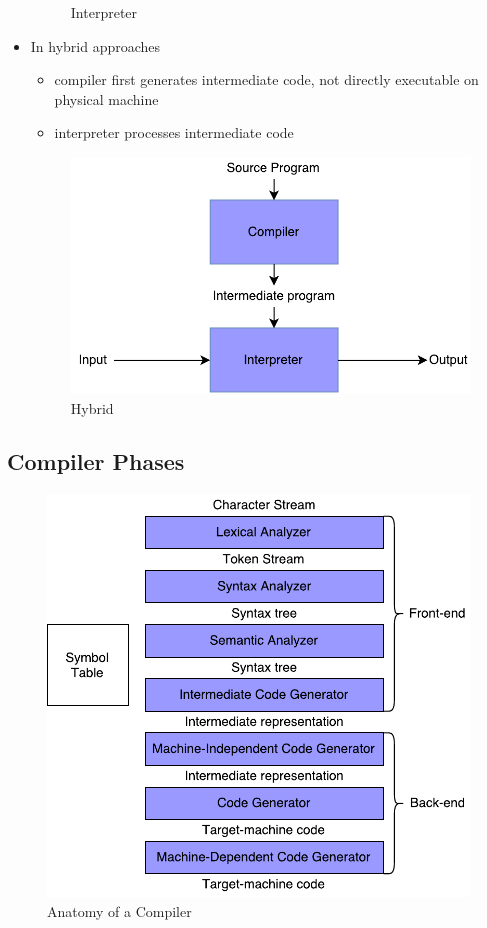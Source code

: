 \documentclass{scrartcl}
\begin{document}
\begin{itemize}
\begin{figure}[ht!]
		\caption{Interpreter}
		\label{fig:interpreters}
	\end{figure}
	\item In hybrid approaches
	\begin{itemize}
		\item compiler first generates intermediate code, not directly executable on physical machine
		\item interpreter processes intermediate code
	\end{itemize}
	\begin{figure}[ht!]
		\centering
		\includegraphics[width=0.7\linewidth]{figures/in_hybrid_processors}
		\caption{Hybrid}
		\label{fig:inhybridprocessors}
	\end{figure}
\end{itemize}

\subsection{Compiler Phases}

\begin{figure}[ht!]
	\centering
	\includegraphics[width=0.7\linewidth]{figures/anatomy_of_a_compiler}
	\caption{Anatomy of a Compiler}
	\label{fig:anatomyofacompiler}
\end{figure}
\end{document}
